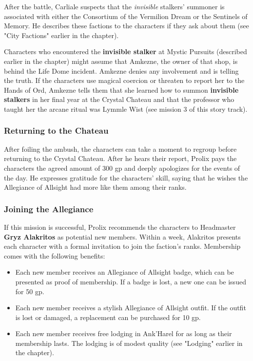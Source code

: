 \documentclass[a4paper, 11pt, bg=full, twocolumn, nooutline]{dndbook}
\begin{document}
After the battle, Carliale suspects that the \textit{invisible} stalkers' summoner is associated with either the Consortium of the Vermilion Dream or the Sentinels of Memory. He describes these factions to the characters if they ask about them (see "City Factions" earlier in the chapter).

Characters who encountered the \textbf{invisible stalker} at Mystic Pursuits (described earlier in the chapter) might assume that Amkezne, the owner of that shop, is behind the Life Dome incident. Amkezne denies any involvement and is telling the truth. If the characters use magical coercion or threaten to report her to the Hands of Ord, Amkezne tells them that she learned how to summon \textbf{invisible stalkers} in her final year at the Crystal Chateau and that the professor who taught her the arcane ritual was Lymmle Wist (see mission 3 of this story track).

\subsubsection{Returning to the Chateau}

After foiling the ambush, the characters can take a moment to regroup before returning to the Crystal Chateau. After he hears their report, Prolix pays the characters the agreed amount of 300 gp and deeply apologizes for the events of the day. He expresses gratitude for the characters' skill, saying that he wishes the Allegiance of Allsight had more like them among their ranks.

\subsubsection{Joining the Allegiance}

If this mission is successful, Prolix recommends the characters to Headmaster \textbf{Gryz Alakritos} as potential new members. Within a week, Alakritos presents each character with a formal invitation to join the faction's ranks. Membership comes with the following benefits:

\begin{itemize}
\item Each new member receives an Allegiance of Allsight badge, which can be presented as proof of membership. If a badge is lost, a new one can be issued for 50 gp.
\item Each new member receives a stylish Allegiance of Allsight outfit. If the outfit is lost or damaged, a replacement can be purchased for 10 gp.
\item Each new member receives free lodging in Ank'Harel for as long as their membership lasts. The lodging is of modest quality (see "Lodging" earlier in the chapter).
\end{itemize}
\end{document}
